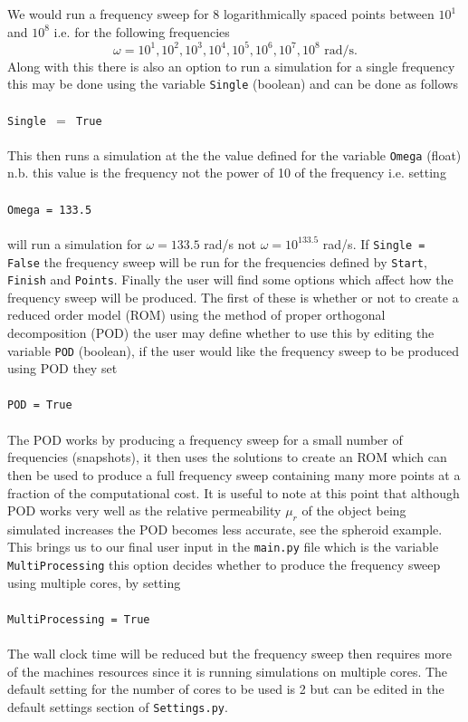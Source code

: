 We would run a frequency sweep for 8 logarithmically spaced points between $10^1$ and $10^8$ i.e. for the following frequencies
$$\omega = 10^1,10^2,10^3,10^4,10^5,10^6,10^7,10^8\textrm{ rad/s}.$$
Along with this there is also an option to run a simulation for a single frequency this may be done using the variable \texttt{Single} (boolean) and can be done as follows\\
\\
\texttt{Single $=$ True}\\
\\
This then runs a simulation at the the value defined for the variable \texttt{Omega} (float) n.b. this value is the frequency not the power of 10 of the frequency i.e. setting\\
\\
\texttt{Omega = 133.5}\\
\\
will run a simulation for $\omega=133.5$ rad/s not $\omega=10^{133.5}$ rad/s. If \texttt{Single = False} the frequency sweep will be run for the frequencies defined by \texttt{Start}, \texttt{Finish} and \texttt{Points}. Finally the user will find some options which affect how the frequency sweep will be produced. The first of these is whether or not to create a reduced order model (ROM) using the method of proper orthogonal decomposition (POD) the user may define whether to use this by editing the variable \texttt{POD} (boolean), if the user would like the frequency sweep to be produced using POD they set\\
\\
\texttt{POD = True}\\
\\
The POD works by producing a frequency sweep for a small number of frequencies (snapshots), it then uses the solutions to create an ROM which can then be used to produce a full frequency sweep containing many more points at a fraction of the computational cost. It is useful to note at this point that although POD works very well as the relative permeability $\mu_r$ of the object being simulated increases the POD becomes less accurate, see the spheroid example. This brings us to our final user input in the \texttt{main.py} file which is the variable \texttt{MultiProcessing} this option decides whether to produce the frequency sweep using multiple cores, by setting\\
\\
\texttt{MultiProcessing = True}\\
\\
The wall clock time will be reduced but the frequency sweep then requires more of the machines resources since it is running simulations on multiple cores. The default setting for the number of cores to be used is 2 but can be edited in the default settings section of \texttt{Settings.py}.
\\

